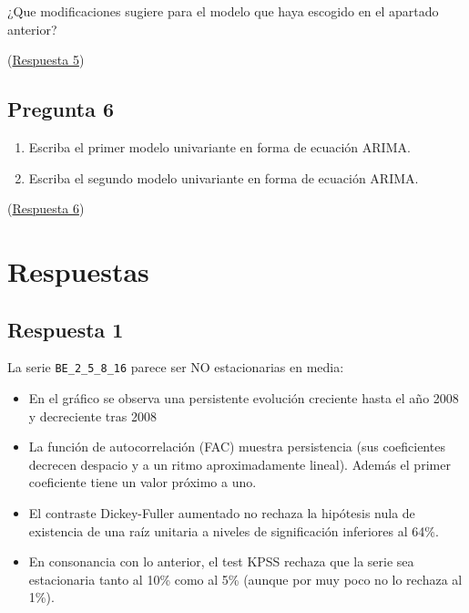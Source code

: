 \documentclass[10pt]{article}
\begin{document}
¿Que modificaciones sugiere para el modelo que haya escogido en el
apartado anterior?

(\hyperref[sec:orge425bc0]{Respuesta 5})
\subsection*{Pregunta 6}
\label{sec:orgfa3ef62}

\begin{enumerate}
\item Escriba el primer modelo univariante en forma de ecuación ARIMA.
\item Escriba el segundo modelo univariante en forma de ecuación ARIMA.
\end{enumerate}

(\hyperref[sec:orge4ce92a]{Respuesta 6})
\section*{Respuestas}
\label{sec:org9b8c042}

\subsection*{Respuesta 1}
\label{sec:org3ff719b}

La serie \texttt{BE\_2\_5\_8\_16} parece ser NO estacionarias en media:
\begin{itemize}
\item En el gráfico se observa una persistente evolución creciente hasta
el año 2008 y decreciente tras 2008

\item La función de autocorrelación (FAC) muestra persistencia (sus
coeficientes decrecen despacio y a un ritmo aproximadamente lineal).
Además el primer coeficiente tiene un valor próximo a uno.

\item El contraste Dickey-Fuller aumentado no rechaza la hipótesis nula de
existencia de una raíz unitaria a niveles de significación
inferiores al 64\%.

\item En consonancia con lo anterior, el test KPSS rechaza que la serie
sea estacionaria tanto al 10\% como al 5\% (aunque por muy poco no lo
rechaza al 1\%).
\end{itemize}
\end{document}
